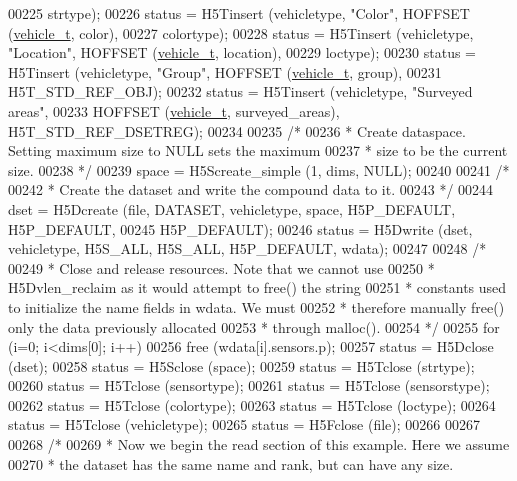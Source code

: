\begin{DoxyCode}
00225                 strtype);
00226     status = H5Tinsert (vehicletype, \textcolor{stringliteral}{"Color"}, HOFFSET (\hyperlink{structvehicle__t}{vehicle\_t}, color),
00227                 colortype);
00228     status = H5Tinsert (vehicletype, \textcolor{stringliteral}{"Location"}, HOFFSET (\hyperlink{structvehicle__t}{vehicle\_t}, location),
00229                 loctype);
00230     status = H5Tinsert (vehicletype, \textcolor{stringliteral}{"Group"}, HOFFSET (\hyperlink{structvehicle__t}{vehicle\_t}, group),
00231                 H5T\_STD\_REF\_OBJ);
00232     status = H5Tinsert (vehicletype, \textcolor{stringliteral}{"Surveyed areas"},
00233                 HOFFSET (\hyperlink{structvehicle__t}{vehicle\_t}, surveyed\_areas), H5T\_STD\_REF\_DSETREG);
00234 
00235     \textcolor{comment}{/*}
00236 \textcolor{comment}{     * Create dataspace.  Setting maximum size to NULL sets the maximum}
00237 \textcolor{comment}{     * size to be the current size.}
00238 \textcolor{comment}{     */}
00239     space = H5Screate\_simple (1, dims, NULL);
00240 
00241     \textcolor{comment}{/*}
00242 \textcolor{comment}{     * Create the dataset and write the compound data to it.}
00243 \textcolor{comment}{     */}
00244     dset = H5Dcreate (file, DATASET, vehicletype, space, H5P\_DEFAULT, H5P\_DEFAULT,
00245                 H5P\_DEFAULT);
00246     status = H5Dwrite (dset, vehicletype, H5S\_ALL, H5S\_ALL, H5P\_DEFAULT, wdata);
00247 
00248     \textcolor{comment}{/*}
00249 \textcolor{comment}{     * Close and release resources.  Note that we cannot use}
00250 \textcolor{comment}{     * H5Dvlen\_reclaim as it would attempt to free() the string}
00251 \textcolor{comment}{     * constants used to initialize the name fields in wdata.  We must}
00252 \textcolor{comment}{     * therefore manually free() only the data previously allocated}
00253 \textcolor{comment}{     * through malloc().}
00254 \textcolor{comment}{     */}
00255     \textcolor{keywordflow}{for} (i=0; i<dims[0]; i++)
00256         free (wdata[i].sensors.p);
00257     status = H5Dclose (dset);
00258     status = H5Sclose (space);
00259     status = H5Tclose (strtype);
00260     status = H5Tclose (sensortype);
00261     status = H5Tclose (sensorstype);
00262     status = H5Tclose (colortype);
00263     status = H5Tclose (loctype);
00264     status = H5Tclose (vehicletype);
00265     status = H5Fclose (file);
00266 
00267 
00268     \textcolor{comment}{/*}
00269 \textcolor{comment}{     * Now we begin the read section of this example.  Here we assume}
00270 \textcolor{comment}{     * the dataset has the same name and rank, but can have any size.}

\end{DoxyCode}

